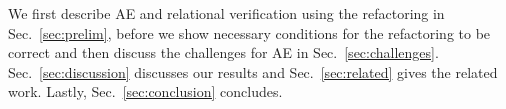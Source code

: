 We first describe AE and relational verification using the  refactoring in Sec.~\ref{sec:prelim}, before we show necessary conditions for the  refactoring to be correct  and then discuss the challenges for AE in Sec.~\ref{sec:challenges}. Sec.~\ref{sec:discussion} discusses our results and Sec.~\ref{sec:related} gives the related work. Lastly, Sec.~\ref{sec:conclusion} concludes.




